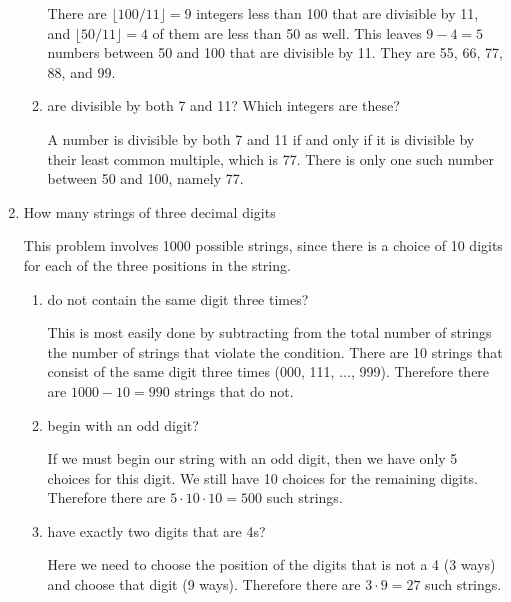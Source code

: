 \documentclass[11pt]{article}
\begin{document}
\begin{enumerate}[label=\textbf{\arabic*.}]
\begin{enumerate}[label=\textbf{\alph*)}]
		There are $\lfloor 100 / 11 \rfloor = 9$ integers less than 100 that are divisible by 11, and $\lfloor 50 / 11 \rfloor = 4$ of them are less than 50 as well. This leaves $9 - 4 = 5$ numbers between 50 and 100 that are divisible by 11. They are 55, 66, 77, 88, and 99.
		
		\item are divisible by both 7 and 11? Which integers are these?
		
		A number is divisible by both 7 and 11 if and only if it is divisible by their least common multiple, which is 77. There is only one such number between 50 and 100, namely 77.
	\end{enumerate}

	\item How many strings of three decimal digits
	
	This problem involves 1000 possible strings, since there is a choice of 10 digits for each of the three positions in the string.
	
	\begin{enumerate}[label=\textbf{\alph*)}]
		\item do not contain the same digit three times?
		
		This is most easily done by subtracting from the total number of strings the number of strings that violate the condition. There are 10 strings that consist of the same digit three times (000, 111, $\ldots$, 999). Therefore there are $1000 - 10 = 990$ strings that do not.
		
		\item begin with an odd digit?
		
		If we must begin our string with an odd digit, then we have only 5 choices for this digit. We still have 10 choices for the remaining digits. Therefore there are $5 \cdot 10 \cdot 10 = 500$ such strings.
		
		\item have exactly two digits that are 4s?
		
		Here we need to choose the position of the digits that is not a 4 (3 ways) and choose that digit (9 ways). Therefore there are $3 \cdot 9 = 27$ such strings.
	\end{enumerate}
\end{enumerate}
\end{document}
